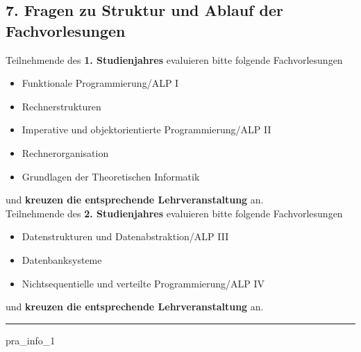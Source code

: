 \documentclass[a4paper,10pt]{article}
\begin{document}
{\pagebreak



\pagebreak


\subsection*{7. Fragen zu Struktur und Ablauf der Fachvorlesungen}

Teilnehmende des \textbf{1. Studienjahres} evaluieren bitte folgende Fachvorlesungen
\begin{itemize}
	\item Funktionale Programmierung/ALP I
	\item Rechnerstrukturen
	\item Imperative und objektorientierte Programmierung/ALP II
	\item Rechnerorganisation
	\item Grundlagen der Theoretischen Informatik
\end{itemize}
und \textbf{kreuzen die entsprechende Lehrveranstaltung} an. \\

Teilnehmende des \textbf{2. Studienjahres} evaluieren bitte folgende Fachvorlesungen
\begin{itemize}
	\item Datenstrukturen und Datenabstraktion/ALP III
	\item Datenbanksysteme
	\item Nichtsequentielle und verteilte Programmierung/ALP IV
\end{itemize}
und \textbf{kreuzen die entsprechende Lehrveranstaltung} an.

\vspace{.5cm}
\noindent\rule{\textwidth}{1pt}
\vspace{0.5cm}

\begin{questionmult}{pra_info_1}
	\begin{choices}
	\end{choices}
\end{questionmult}


 \\

}
\end{document}
